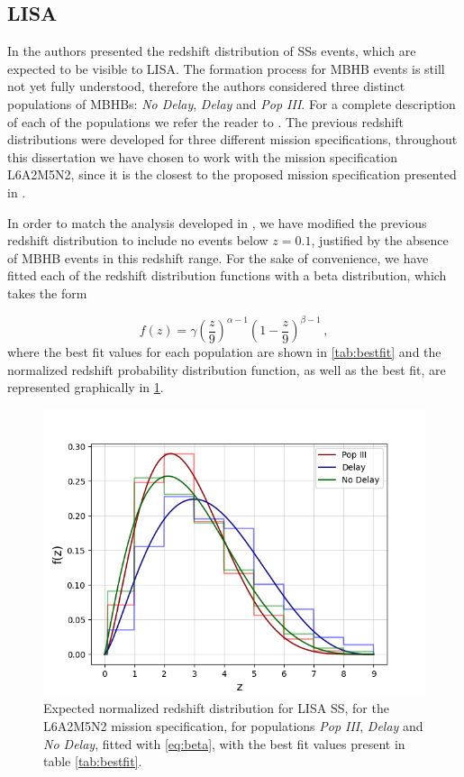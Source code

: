 \subsection{LISA}
\label{subsec:LISA}

In \cite{Caprini2016} the authors presented the redshift distribution of \glspl{SS} events, which are expected to be visible to LISA. The formation process for \gls{MBHB} events is still not yet fully understood, therefore the authors considered three distinct populations of \glspl{MBHB}: \textit{No Delay}, \textit{Delay} and \textit{Pop III}. For a complete description of each of the populations we refer the reader to \cite{Antonini2015}. The previous redshift distributions were developed for three different mission specifications, throughout this dissertation we have chosen to work with the mission specification L6A2M5N2, since it is the closest to the proposed mission specification presented in \cite{LISA-proposal}.

In order to match the analysis developed in \cite{Speri2021}, we have modified the previous redshift distribution to include no events below $z = 0.1$, justified by the absence of \gls{MBHB} events in this redshift range. For the sake of convenience, we have fitted each of the redshift distribution functions with a beta distribution, which takes the form

\begin{equation}
    \label{eq:beta}
    f(z) = \gamma \left( \frac{z}{9} \right)^{\alpha - 1} \left(1 - \frac{z}{9} \right)^{\beta - 1} \,,
\end{equation}
where the best fit values for each population are shown in \cref{tab:bestfit} and the normalized redshift probability distribution function, as well as the best fit, are represented graphically in \cref{fig:mbhb-dist}.

\begin{figure}[h!]
    \centering
    \includegraphics[width=0.65\columnwidth]{figures/MBHB-dist.png}
    \caption[Expected redshift distribution for LISA SS events]
    {Expected normalized redshift distribution for \gls{LISA} \gls{SS}, for the L6A2M5N2 mission specification, for populations \textit{Pop III}, \textit{Delay} and \textit{No Delay}, fitted with \cref{eq:beta}, with the best fit values present in table \ref{tab:bestfit}.}
    \label{fig:mbhb-dist}
\end{figure}

